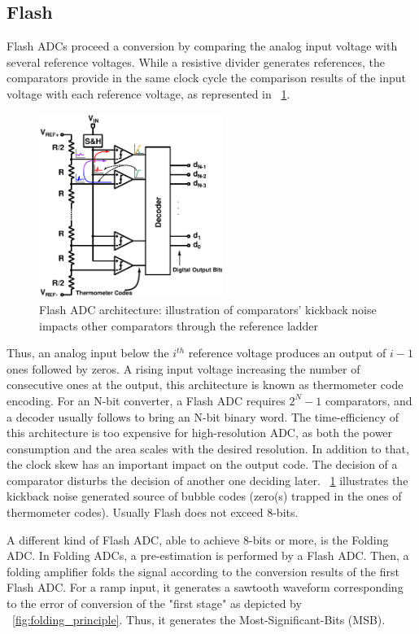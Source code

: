 \subsection{Flash}                             %
\label{sec:flash-adc}
Flash ADCs proceed a conversion by comparing the analog input voltage with several reference voltages. While a resistive divider generates references, the comparators provide in the same clock cycle the comparison results of the input voltage with each reference voltage, as represented in \figurename~\ref{fig:flash_kickback}.

\begin{figure}[htp]
	\centering
	\includegraphics[height=6cm]{Chapter3/Figs/flash_adc.ps}
	\caption{Flash ADC architecture: illustration of comparators' kickback noise impacts other comparators through the reference ladder}
	\label{fig:flash_kickback}
\end{figure}

Thus, an analog input below the \(i^{th} \) reference voltage produces an output of \(i-1 \) ones followed by zeros. A rising input voltage increasing the number of consecutive ones at the output, this architecture is known as thermometer code encoding. For an N-bit converter, a Flash ADC requires \(2^N-1\) comparators, and a decoder usually follows to bring an N-bit binary word. The time-efficiency of this architecture is too expensive for high-resolution ADC, as both the power consumption and the area scales with the desired resolution. In addition to that, the clock skew has an important impact on the output code. The decision of a comparator disturbs the decision of another one deciding later. \figurename~\ref{fig:flash_kickback} illustrates the kickback noise generated source of bubble codes (zero(s) trapped in the ones of thermometer codes). Usually Flash does not exceed 8-bits.

A different kind of Flash ADC, able to achieve 8-bits or more, is the Folding ADC. In Folding ADCs, a pre-estimation is performed by a Flash ADC. Then, a folding amplifier folds the signal according to the conversion results of the first Flash ADC. For a ramp input, it generates a sawtooth waveform corresponding to the error of conversion of the "first stage" as depicted by \figurename~\ref{fig:folding_principle}. Thus, it generates the Most-Significant-Bits (MSB).

